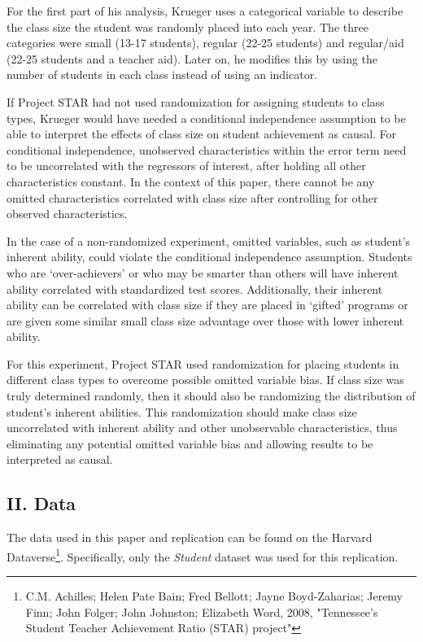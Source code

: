 \documentclass[a4paper,11pt]{article}
\begin{document}
For the first part of his analysis, Krueger uses a categorical variable to describe the class size the student was randomly placed into each year. The three categories were small (13-17 students), regular (22-25 students) and regular/aid (22-25 students and a teacher aid). Later on, he modifies this by using the number of students in each class instead of using an indicator. \par

If Project STAR had not used randomization for assigning students to class types, Krueger would have needed a conditional independence assumption to be able to interpret the effects of class size on student achievement as causal. For conditional independence, unobserved characteristics within the error term need to be uncorrelated with the regressors of interest, after holding all other characteristics constant. In the context of this paper, there cannot be any omitted characteristics correlated with class size after controlling for other observed characteristics. \par

In the case of a non-randomized experiment, omitted variables, such as student’s inherent ability, could violate the conditional independence assumption. Students who are ‘over-achievers’ or who may be smarter than others will have inherent ability correlated with standardized test scores. Additionally, their inherent ability can be correlated with class size if they are placed in ‘gifted’ programs or are given some similar small class size advantage over those with lower inherent ability. \par

For this experiment, Project STAR used randomization for placing students in different class types to overcome possible omitted variable bias. If class size was truly determined randomly, then it should also be randomizing the distribution of student’s inherent abilities. This randomization should make class size uncorrelated with inherent ability and other unobservable characteristics, thus eliminating any potential omitted variable bias and allowing results to be interpreted as causal. \\

\subsection*{II. Data}
The data used in this paper and replication can be found on the Harvard Dataverse\footnote{C.M. Achilles; Helen Pate Bain; Fred Bellott; Jayne Boyd-Zaharias; Jeremy Finn; John Folger; John Johnston; Elizabeth Word, 2008, "Tennessee's Student Teacher Achievement Ratio (STAR) project"}. Specifically, only the \textit{Student} dataset was used for this replication. \par
\end{document}

